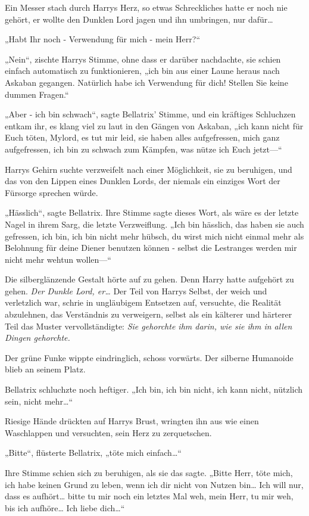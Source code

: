 {Ein Messer stach durch Harrys Herz, so etwas Schreckliches hatte er noch nie gehört, er wollte den Dunklen Lord jagen und ihn umbringen, nur dafür…

„Habt Ihr noch - Verwendung für mich - mein Herr?“

„Nein“, zischte Harrys Stimme, ohne dass er darüber nachdachte, sie schien einfach automatisch zu funktionieren, „ich bin aus einer Laune heraus nach Askaban gegangen. Natürlich habe ich Verwendung für dich! Stellen Sie keine dummen Fragen.“

„Aber - ich bin schwach“, sagte Bellatrix' Stimme, und ein kräftiges Schluchzen entkam ihr, es klang viel zu laut in den Gängen von Askaban, „ich kann nicht für Euch töten, Mylord, es tut mir leid, sie haben alles aufgefressen, mich ganz aufgefressen, ich bin zu schwach zum Kämpfen, was nütze ich Euch jetzt—“

Harrys Gehirn suchte verzweifelt nach einer Möglichkeit, sie zu beruhigen, und das von den Lippen eines Dunklen Lords, der niemals ein einziges Wort der Fürsorge sprechen würde.

„Hässlich“, sagte Bellatrix. Ihre Stimme sagte dieses Wort, als wäre es der letzte Nagel in ihrem Sarg, die letzte Verzweiflung. „Ich bin hässlich, das haben sie auch gefressen, ich bin, ich bin nicht mehr hübsch, du wirst mich nicht einmal mehr als Belohnung für deine Diener benutzen können - selbst die Lestranges werden mir nicht mehr wehtun wollen—“

Die silberglänzende Gestalt hörte auf zu gehen. Denn Harry hatte aufgehört zu gehen. \emph{Der Dunkle Lord, er…} Der Teil von Harrys Selbst, der weich und verletzlich war, schrie in ungläubigem Entsetzen auf, versuchte, die Realität abzulehnen, das Verständnis zu verweigern, selbst als ein kälterer und härterer Teil das Muster vervollständigte: \emph{Sie gehorchte ihm darin, wie sie ihm in allen Dingen gehorchte.}

Der grüne Funke wippte eindringlich, schoss vorwärts. Der silberne Humanoide blieb an seinem Platz.

Bellatrix schluchzte noch heftiger. „Ich bin, ich bin nicht, ich kann nicht, nützlich sein, nicht mehr…“

Riesige Hände drückten auf Harrys Brust, wringten ihn aus wie einen Waschlappen und versuchten, sein Herz zu zerquetschen.

„Bitte“, flüsterte Bellatrix, „töte mich einfach…“

Ihre Stimme schien sich zu beruhigen, als sie das sagte. „Bitte Herr, töte mich, ich habe keinen Grund zu leben, wenn ich dir nicht von Nutzen bin… Ich will nur, dass es aufhört… bitte tu mir noch ein letztes Mal weh, mein Herr, tu mir weh, bis ich aufhöre… Ich liebe dich…“

}
